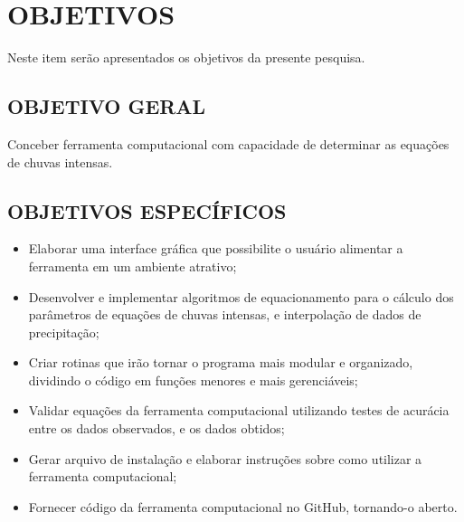\chapter{OBJETIVOS}

Neste item serão apresentados os objetivos da presente pesquisa.

\section{OBJETIVO GERAL}

Conceber ferramenta computacional com capacidade de determinar as equações de chuvas intensas. 

\section{OBJETIVOS ESPECÍFICOS}

\begin{itemize}
        \item Elaborar uma interface gráfica que possibilite o usuário alimentar a ferramenta em um ambiente atrativo;
        \item Desenvolver e implementar algoritmos de equacionamento para o cálculo dos parâmetros de equações de chuvas intensas, e interpolação de dados de precipitação;
        \item Criar rotinas que irão tornar o programa mais modular e organizado, dividindo o código em funções menores e mais gerenciáveis;
        \item Validar equações da ferramenta computacional utilizando testes de acurácia entre os dados observados, e os dados obtidos;
        \item Gerar arquivo de instalação e elaborar instruções sobre como utilizar a ferramenta computacional;

        \item Fornecer código da ferramenta computacional no GitHub, tornando-o aberto.
\end{itemize}

